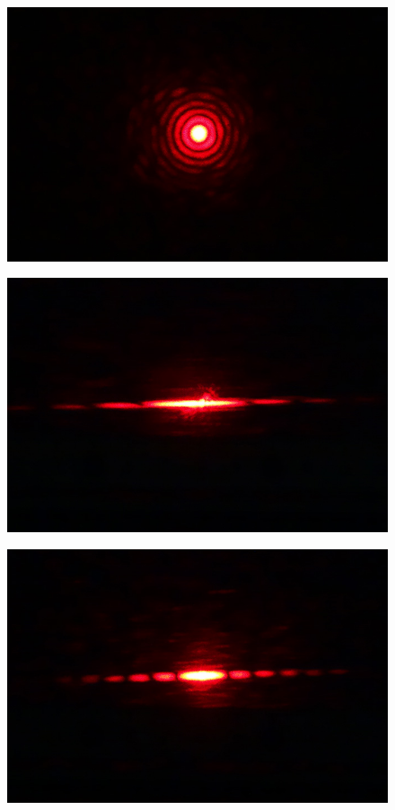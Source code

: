\begin{figure}[htbp]
	\begin{minipage}[ht]{0.48\hsize}\centering
		\includegraphics[width=\linewidth]{src/figures/result/CIRCLE.jpg}
		\label{subfig:circle_screen}
	\end{minipage}
	\begin{minipage}[ht]{0.48\hsize}\centering
		\includegraphics[width=\linewidth]{src/figures/result/SS1.JPG}
		\label{subfig:ss1_screen}
	\end{minipage}
	\begin{minipage}[ht]{0.48\hsize}\centering
		\includegraphics[width=\linewidth]{src/figures/result/SS2.JPG}

\end{minipage}
\end{figure}
